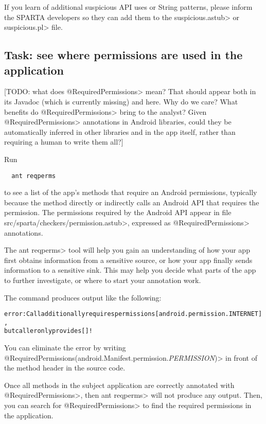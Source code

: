 If you learn of additional suspicious API uses or String patterns, please
inform the SPARTA developers so they can add them to the
\<suspicious.astub> or \<suspicious.pl> file.


\subsection{Task: see where permissions are used in the application}
\label{sec:appanalysis/reqperms}

[TODO: what does \<@RequiredPermissions> mean?  That should appear both in
its Javadoc (which is currently missing) and here.  Why do we care?  What
benefits do \<@RequiredPermissions> bring to the analyst?  Given
\<@RequiredPermissions> annotations in Android libraries, could they be
automatically inferred in other libraries and in the app itself, rather
than requiring a human to write them all?]

Run

\begin{Verbatim}
  ant reqperms
\end{Verbatim}

\noindent
to see a list of the app's methods
that require an Android permissions, typically because the method
directly or indirectly calls an Android API that requires the permission.
The permissions required by the Android API appear in file
\<src/sparta/checkers/permission.astub>, expressed as
\<@RequiredPermissions> annotations.

The \<ant reqperms> tool will help you gain an understanding of how your
app first obtains information from a sensitive source, or how your app
finally sends information to a sensitive sink.  This may help you decide
what parts of the app to further investigate, or where to start your
annotation work.

The command produces output like the following:
\begin{alltt}
error: Call additionally requires permissions [android.permission.INTERNET], 
   but caller only provides []!
\end{alltt}
You can eliminate the error by writing
\<@RequiredPermissions({android.Manifest.permission.\emph{PERMISSION}})> in
front of the method header in the source code.

Once all methods in the subject application are correctly annotated with
\<@RequiredPermissions>, then \<ant reqperms> will not produce any output.
Then, you can search for \<@RequiredPermissions> to find the required
permissions in the application.

